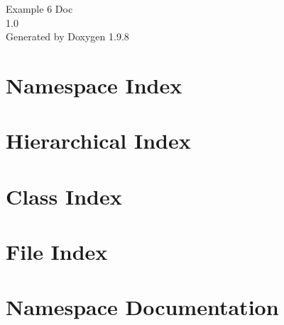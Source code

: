 \documentclass[twoside]{book}
\newcommand{\+}{\discretionary{\mbox{\scriptsize$\hookleftarrow$}}{}{}}
\newcommand{\clearemptydoublepage}{%
    \newpage{\pagestyle{empty}\cleardoublepage}%
  }
\begin{document}
  \raggedbottom
    \hypersetup{pageanchor=false,
                bookmarksnumbered=true,
                pdfencoding=unicode
               }
  \begin{titlepage}
  \vspace*{7cm}
  \begin{center}%
  {\Large Example 6 Doc}\\
  [1ex]\large 1.\+0 \\
  \vspace*{1cm}
  {\large Generated by Doxygen 1.9.8}\\
  \end{center}
  \end{titlepage}
  \clearemptydoublepage
  \tableofcontents
  \clearemptydoublepage
  \hypersetup{pageanchor=true}
\chapter{Namespace Index}

\chapter{Hierarchical Index}

\chapter{Class Index}

\chapter{File Index}

\chapter{Namespace Documentation}










\end{document}
